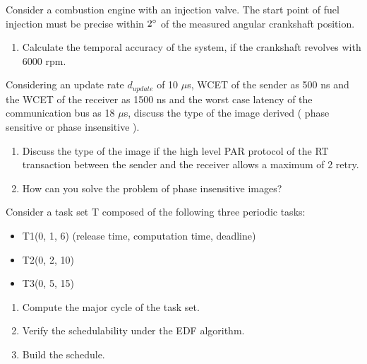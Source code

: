 
Consider a combustion engine with an injection valve. The start point of fuel injection must be precise within $2^\circ$ of the measured angular crankshaft position.
\begin{enumerate}
\item Calculate the temporal accuracy of the system, if the crankshaft revolves with 6000 rpm.
\end{enumerate}


Considering an update rate $d_{update}$ of 10 $\mu$s, WCET of the sender as 500 ns and the WCET of the receiver as 1500 ns and the worst case latency of the communication bus as 18 $\mu$s, discuss the type of the image derived ( phase sensitive or phase insensitive ).

\begin{enumerate}
\addtocounter{enumi}{1}
\item Discuss the type of the image if the high level PAR protocol of the RT transaction between the sender and the receiver allows a maximum of 2 retry.
\item How can you solve the problem of phase insensitive images?
\end{enumerate}



\pagebreak


Consider a task set T composed of the following three periodic tasks:
\begin{itemize}
\item T1(0, 1, 6) (release time, computation time, deadline)
\item T2(0, 2, 10)
\item T3(0, 5, 15)
\end{itemize}

\begin{enumerate}
\item Compute the major cycle of the task set. 
\item Verify the schedulability under the EDF algorithm. 
\item Build the schedule.
\end{enumerate}

